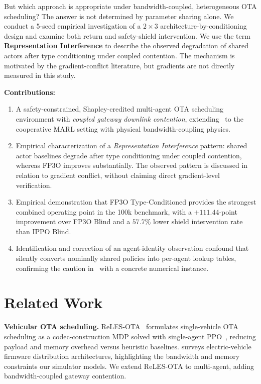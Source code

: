 \documentclass[conference]{IEEEtran}
\begin{document}
But which approach is appropriate under bandwidth-coupled, heterogeneous OTA scheduling?
The answer is not determined by parameter sharing alone. We conduct a 5-seed empirical
investigation of a $2\times3$ architecture-by-conditioning design and examine both
return and safety-shield intervention. We use the term \textbf{Representation Interference}
to describe the observed degradation of shared actors after type conditioning under
coupled contention. The mechanism is motivated by the gradient-conflict literature,
but gradients are not directly measured in this study.

\textbf{Contributions:}
\begin{enumerate}
  \item A safety-constrained, Shapley-credited multi-agent OTA scheduling environment
    with \emph{coupled gateway downlink contention}, extending~\cite{b1} to the
    cooperative MARL setting with physical bandwidth-coupling physics.
  \item Empirical characterization of a \emph{Representation Interference} pattern:
    shared actor baselines degrade after type conditioning under coupled contention,
    whereas FP3O improves substantially. The observed pattern is discussed in relation
    to gradient conflict, without claiming direct gradient-level verification.
  \item Empirical demonstration that FP3O Type-Conditioned provides the strongest
    combined operating point in the 100k benchmark, with a $+111.44$-point improvement
    over FP3O Blind and a $57.7\%$ lower shield intervention rate than IPPO Blind.
  \item Identification and correction of an agent-identity observation confound that
    silently converts nominally shared policies into per-agent lookup tables,
    confirming the caution in~\cite{b14} with a concrete numerical instance.
\end{enumerate}


\section{Related Work}

\textbf{Vehicular OTA scheduling.}
ReLES-OTA~\cite{b1} formulates single-vehicle OTA scheduling as a codec-construction
MDP solved with single-agent PPO~\cite{schulman2017ppo}, reducing payload and memory
overhead versus heuristic baselines. \cite{halder2020ota} surveys electric-vehicle
firmware distribution architectures, highlighting the bandwidth and memory constraints
our simulator models. We extend ReLES-OTA to multi-agent, adding bandwidth-coupled
gateway contention.
\end{document}
